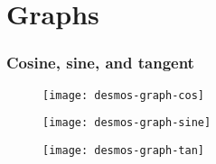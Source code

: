 \documentclass[letterpaper,9pt,fleqn]{extarticle}
\begin{document}
\section*{Graphs}
\vspace{-0.2in}
\subsubsection*{Cosine, sine, and tangent}
\vspace{-0.2in}
\begin{figure}[h]
\centering
\begin{minipage}{.333\textwidth}
  \centering
  \texttt{[image: desmos-graph-cos]}
\end{minipage}%
\begin{minipage}{.333\textwidth}
  \centering
  \texttt{[image: desmos-graph-sine]}
\end{minipage}%
\begin{minipage}{.333\textwidth}
  \centering
  \texttt{[image: desmos-graph-tan]}
\end{minipage}
\end{figure}
\vspace{-0.2in}
\end{document}
